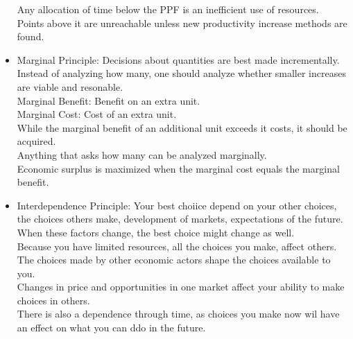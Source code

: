 \documentclass[nobib]{tufte-handout}
\begin{document}
\begin{itemize}
\begin{center}
          \end{center}
          Any allocation of time below the PPF is an inefficient use of resources.\\ Points above it are unreachable unless new productivity increase methods are found.\\
    \item Marginal Principle: Decisions about quantities are best made incrementally.
          Instead of analyzing how many, one should analyze whether smaller increases are
          viable and resonable.\\ \quad Marginal Benefit: Benefit on an extra unit.\\
          \quad Marginal Cost: Cost of an extra unit.\\ While the marginal benefit of an
          additional unit exceeds it costs, it should be acquired.\\ Anything that asks
          how many can be analyzed marginally.\\ Economic surplus is maximized when the
          marginal cost equals the marginal benefit.
    \item Interdependence Principle: Your best choiice depend on your other choices, the
          choices others make, development of markets, expectations of the future. When
          these factors change, the best choice might change as well. \\\quad Because you
          have limited resources, all the choices you make, affect others. \\\quad The
          choices made by other economic actors shape the choices available to you.
          \\\quad Changes in price and opportunities in one market affect your ability to
          make choices in others.\\\quad There is also a dependence through time, as
          choices you make now wil have an effect on what you can ddo in the future.\\
\end{itemize}
\end{document}
